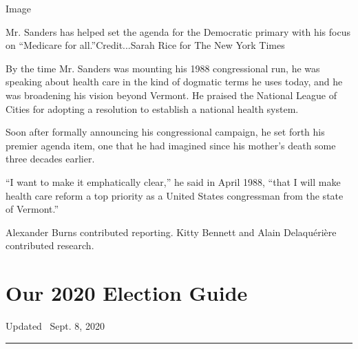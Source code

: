 Image

Mr. Sanders has helped set the agenda for the Democratic primary with
his focus on ``Medicare for all.''Credit...Sarah Rice for The New York
Times

By the time Mr. Sanders was mounting his 1988 congressional run, he was
speaking about health care in the kind of dogmatic terms he uses today,
and he was broadening his vision beyond Vermont. He praised the National
League of Cities for adopting a resolution to establish a national
health system.

Soon after formally announcing his congressional campaign, he set forth
his premier agenda item, one that he had imagined since his mother's
death some three decades earlier.

``I want to make it emphatically clear,'' he said in April 1988, ``that
I will make health care reform a top priority as a United States
congressman from the state of Vermont.''

Alexander Burns contributed reporting. Kitty Bennett and Alain
Delaquérière contributed research.

\hypertarget{our-2020-election-guide}{%
\section{Our 2020 Election Guide}\label{our-2020-election-guide}}

Updated ~Sept. 8, 2020

\begin{center}\rule{0.5\linewidth}{\linethickness}\end{center}

